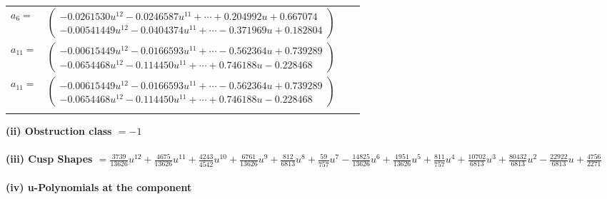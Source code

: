 \documentclass[1p]{elsarticle_modified}
\theoremstyle{definition}
\begin{document}
\begin{tabular}{m{7pt} m{180pt} m{7pt} m{180pt} }
\flushright $a_{6}=$&$\begin{pmatrix}-0.0261530 u^{12}-0.0246587 u^{11}+\cdots+0.204992 u+0.667074\\-0.00541449 u^{12}-0.0404374 u^{11}+\cdots-0.371969 u+0.182804\end{pmatrix}$ \\
\flushright $a_{11}=$&$\begin{pmatrix}-0.00615449 u^{12}-0.0166593 u^{11}+\cdots-0.562364 u+0.739289\\-0.0654468 u^{12}-0.114450 u^{11}+\cdots+0.746188 u-0.228468\end{pmatrix}$\\ \flushright $a_{11}=$&$\begin{pmatrix}-0.00615449 u^{12}-0.0166593 u^{11}+\cdots-0.562364 u+0.739289\\-0.0654468 u^{12}-0.114450 u^{11}+\cdots+0.746188 u-0.228468\end{pmatrix}$\\&\end{tabular}
\flushleft \textbf{(ii) Obstruction class $= -1$}\\~\\
\flushleft \textbf{(iii) Cusp Shapes $= \frac{3739}{13626} u^{12}+\frac{4675}{13626} u^{11}+\frac{4243}{4542} u^{10}+\frac{6761}{13626} u^9+\frac{812}{6813} u^8+\frac{59}{757} u^7-\frac{14825}{13626} u^6+\frac{1951}{13626} u^5+\frac{811}{757} u^4+\frac{10702}{6813} u^3+\frac{80432}{6813} u^2-\frac{22922}{6813} u+\frac{4756}{2271}$}\\~\\
\newpage\renewcommand{\arraystretch}{1}
\flushleft \textbf{(iv) u-Polynomials at the component}\newline \\
\end{document}
